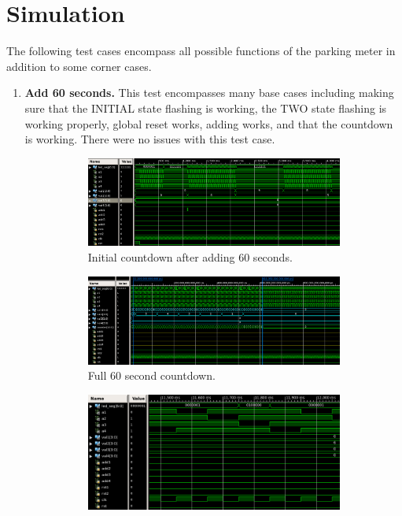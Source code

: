 \documentclass{article}
\begin{document}
\section{Simulation}
The following test cases encompass all possible functions of the parking meter in addition to some corner cases.
\begin{enumerate}
    \item \textbf{Add 60 seconds.} This test encompasses many base cases including making sure that the INITIAL state flashing is working, the TWO state flashing is working properly, global reset works, adding works, and that the countdown is working. There were no issues with this test case.
        \begin{figure}[H]
            \centering
            \begin{subfigure}{\textwidth}
                \centering
                \includegraphics[scale=0.34]{../figs/add60-m.png}
                \caption{Initial countdown after adding 60 seconds.}
            \end{subfigure}
            \begin{subfigure}{\textwidth}
                \includegraphics[scale=0.4]{../figs/add60-l.png}
                \caption{Full 60 second countdown.}
            \end{subfigure}
            \begin{subfigure}{\textwidth}
                \centering
                \includegraphics[scale=0.35]{../figs/add60-s.png}

\end{subfigure}
\end{figure}
\end{enumerate}
\end{document}
